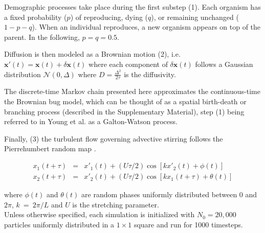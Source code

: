 Demographic processes take place during the first substep (1). Each organism has a fixed probability ($p$) of reproducing, dying ($q$), or remaining unchanged ($1-p-q$). When an individual reproduces, a new organism appears on top of the parent. In the following, $p=q=0.5$.

Diffusion is then modeled as a Brownian motion (2), i.e. $\boldsymbol{x'}(t)=\boldsymbol{x}(t)+\delta\boldsymbol{x}(t)$ where each component of $\delta\boldsymbol{x}(t)$ follows a Gaussian distribution $\mathcal{N}(0,\Delta)$ where $D=\frac{\Delta^2}{2\tau}$ is the diffusivity. 

The discrete-time Markov chain presented here approximates the continuous-time the Brownian bug model, which can be thought of as a spatial birth-death or branching process (described in the Supplementary Material), step (1) being referred to in Young et al. \cite{young_reproductive_2001} as a Galton-Watson process.

Finally, (3) the turbulent flow governing advective stirring follows the Pierrehumbert random map \citep{pierrehumbert_tracer_1994}.

\begin{eqnarray}
 x_1(t+\tau)&=&x'_1(t)+(U\tau/2)\cos[kx'_2(t)+\phi(t)] \label{eq:map1} \\
 x_2(t+\tau)&=&x'_2(t)+(U\tau/2)\cos[kx_1(t+\tau)+\theta(t)] \label{eq:map2}
 \label{eq:pierrehumbert}
 \end{eqnarray}

 where $\phi(t)$ and $\theta(t)$ are random phases uniformly distributed between 0 and $2\pi$, $k~=~2\pi/L$ and $U$ is the stretching parameter. \\
 
Unless otherwise specified, each simulation is initialized with $N_0=20,000$ particles uniformly distributed in a $1\times 1$ square and run for 1000 timesteps. 
 
% 
% 
% 
